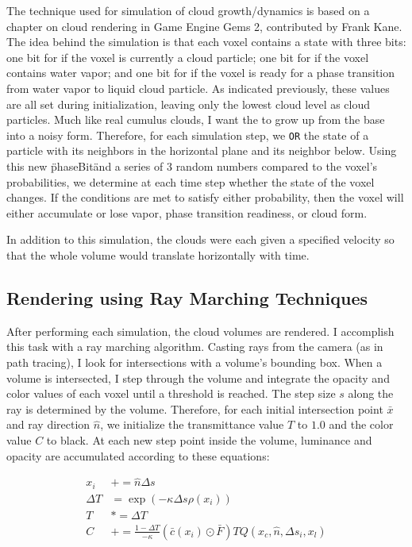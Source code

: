 \documentclass{jcgt}
\begin{document}
The technique used for simulation of cloud growth/dynamics is based on a
chapter on cloud rendering in Game Engine Gems 2, contributed by Frank Kane. The idea
behind the simulation is that each voxel contains a state with three bits: one bit
for if the voxel is currently a cloud particle; one bit for if the 
voxel contains water vapor; and one bit for if the voxel is ready for a phase
transition from water vapor to liquid cloud particle. As indicated previously,
these values are all set during initialization, leaving only the lowest cloud level
as cloud particles. Much like real cumulus clouds, I want the to grow up from the
base into a noisy form. Therefore, for each simulation step, we \texttt{OR} the state
of a particle with its neighbors in the horizontal plane and its neighbor below. Using
this new \"phaseBit\" and a series of 3 random numbers compared to the voxel's
probabilities, we determine at each time step whether the state of the voxel changes.
If the conditions are met to satisfy either probability, then the voxel will either
accumulate or lose vapor, phase transition readiness, or cloud form. 

In addition to this simulation, the clouds were each given a specified velocity so
that the whole volume would translate horizontally with time.

\subsection{Rendering using Ray Marching Techniques}

After performing each simulation, the cloud volumes are rendered. I accomplish
this task with a ray marching algorithm. Casting rays from the camera (as in path tracing),
I look for intersections with a volume's bounding box. When a volume is intersected, I 
step through the volume and integrate the opacity and color values of each voxel until 
a threshold is reached. The step size $s$ along the ray is determined by the volume. 
Therefore, for each initial intersection point $\bar{x}$ and ray direction $\hat{n}$, 
we initialize the transmittance value $T$ to $1.0$ and the color value $C$ to black. 
At each new step point inside the volume, luminance and opacity are accumulated according
to these equations:

\begin{align}
\label{raymarch}
x_i & += \hat{n} \Delta s\\
\label{deltaT}
\Delta T & =  \exp(-\kappa \Delta s \rho(x_i))\\
\label{trans}
T & *= \Delta T \\
\label{color}
C & += \frac{1-\Delta T}{-\kappa}(\bar{c}(x_i)\odot \bar{F})TQ(x_c,\hat{n},\Delta s_i, x_l)
\end{align}
\end{document}
